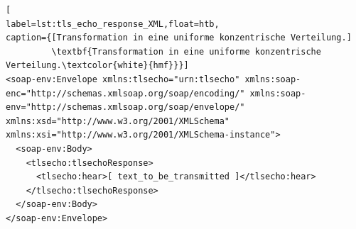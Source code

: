 \begin{lstlisting}[
label=lst:tls_echo_response_XML,float=htb,
caption={[Transformation in eine uniforme konzentrische Verteilung.]
         \textbf{Transformation in eine uniforme konzentrische Verteilung.\textcolor{white}{hmf}}}]
<soap-env:Envelope xmlns:tlsecho="urn:tlsecho" xmlns:soap-enc="http://schemas.xmlsoap.org/soap/encoding/" xmlns:soap-env="http://schemas.xmlsoap.org/soap/envelope/" xmlns:xsd="http://www.w3.org/2001/XMLSchema" xmlns:xsi="http://www.w3.org/2001/XMLSchema-instance">
  <soap-env:Body>
    <tlsecho:tlsechoResponse>
      <tlsecho:hear>[ text_to_be_transmitted ]</tlsecho:hear>
    </tlsecho:tlsechoResponse>
  </soap-env:Body>
</soap-env:Envelope>
\end{lstlisting}

